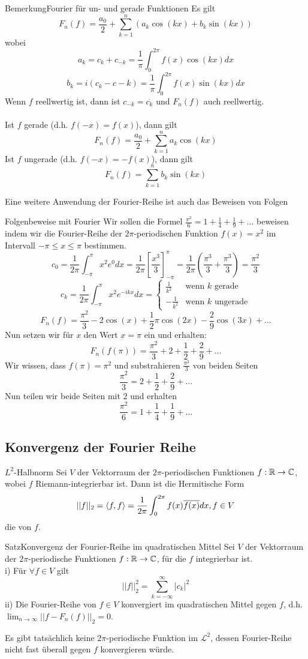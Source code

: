 \begin{Satz}{Bemerkung}{Fourier für un- und gerade Funktionen}
Es gilt $$F_n(f)=\frac{a_0}{2}+\sum_{k=1}^n (a_k\cos(kx)+b_k\sin(kx))$$
wobei $$a_k= c_k+c_{-k}=\frac{1}{\pi}\int_0^{2\pi}f(x)\cos(kx)dx$$
$$b_k=i(c_k-{c-k})=\frac{1}{\pi}\int_0^{2\pi}f(x)\sin(kx)dx$$
Wenn $f$ reellwertig ist, dann ist $c_{-k}=\overline{c_k}$ und $F_n(f)$ auch reellwertig. \\ \\
Ist $f$ gerade (d.h. $f(-x)=f(x)$), dann gilt
$$F_n(f)=\frac{a_0}{2}+\sum_{k=1}^n a_k\cos{(kx)}$$
Ist $f$ ungerade (d.h. $f(-x)=-f(x)$), dann gilt
$$F_n(f)=\sum_{k=1}^n b_k\sin{(kx)}$$
\end{Satz}
Eine weitere Anwendung der Fourier-Reihe ist auch das Beweisen von Folgen
\begin{Beispiel}{Folgenbeweise mit Fourier}
Wir sollen die Formel $\frac{\pi^2}{6}=1+\frac{1}{4}+\frac{1}{9}+\dots$ beweisen indem wir die Fourier-Reihe der $2\pi$-periodischen Funktion $f(x)=x^2$ im Intervall $-\pi\leq x\leq \pi$ bestimmen.
$$c_0=\frac{1}{2\pi}\int_{-\pi}^{\pi}x^2e^0dx=\frac{1}{2\pi}[\frac{x^3}{3}]_{-\pi}^{\pi}=\frac{1}{2\pi}(\frac{\pi^3}{3}+\frac{\pi^3}{3})=\frac{\pi^2}{3}$$
$$c_k=\frac{1}{2\pi}\int_{-\pi}^{\pi}x^2e^{-ikx}dx=\begin{cases} \frac{1}{k^2} & \mbox{wenn $k$ gerade} \\
-\frac{1}{k^2} & \mbox{wenn $k$ ungerade}
\end{cases}$$
$$F_n(f)=\frac{\pi^2}{3}-2\cos(x)+\frac{1}{2}\pi\cos(2x)-\frac{2}{9}\cos(3x)+\dots$$
Nun setzen wir für $x$ den Wert $x=\pi$ ein und erhalten:
$$F_n(f(\pi))=\frac{\pi^2}{3}+2+\frac{1}{2}+\frac{2}{9}+\dots$$
Wir wissen, dass $f(\pi)=\pi^2$ und substrahieren $\frac{\pi^2}{3}$ von beiden Seiten
$$\frac{\pi^2}{3}=2+\frac{1}{2}+\frac{2}{9}+\dots$$
Nun teilen wir beide Seiten mit $2$ und erhalten
$$\frac{\pi^2}{6}=1+\frac{1}{4}+\frac{1}{9}+\dots$$
\end{Beispiel}




\subsection{Konvergenz der Fourier Reihe}\label{ssec:FourierKonv}
\begin{Def}
{$L^2$-Halbnorm}
Sei $V$ der Vektorraum der $2\pi$-periodischen Funktionen $f:\mathbb{R} \rightarrow \mathbb{C}$, wobei $f$ Riemann-integrierbar ist. Dann ist die Hermitische Form 
$$||f||_2=\langle f,f\rangle = \frac{1}{2\pi}\int_0^{2\pi}f(x)\overline{f(x)}dx, \space f\in V$$
die  von $f$.
\end{Def}
\begin{Satz}{Satz}{Konvergenz der Fourier-Reihe im quadratischen Mittel}
Sei $V$ der Vektorraum der $2\pi$-periodische Funktionen $f:\mathbb{R}\rightarrow\mathbb{C}$, für die $f$ integrierbar ist. \\
i) Für $\forall f\in V$ gilt
$$||f||_2^2=\sum_{k=-\infty}^\infty |c_k|^2$$
ii) Die Fourier-Reihe von $f\in V$ konvergiert im quadratischen Mittel gegen $f$, d.h. $\lim_{n\rightarrow \infty}||f-F_n(f)||_2=0$.
\end{Satz}
Es gibt tatsächlich keine $2\pi$-periodische Funktion im $\mathcal{L}^2$, dessen Fourier-Reihe nicht fast überall gegen $f$ konvergieren würde.